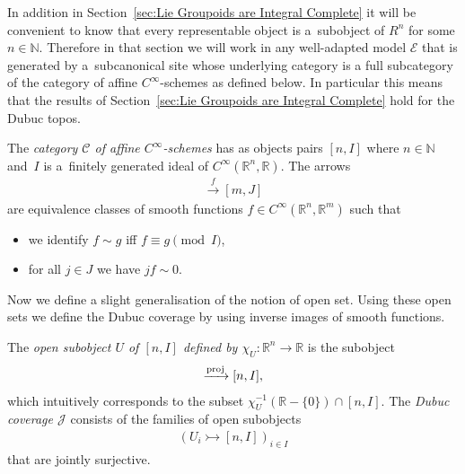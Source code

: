 \documentclass[pdftex]{sigma}
\numberwithin{equation}{section}
\begin{document}
In addition in Section~\ref{sec:Lie Groupoids are Integral Complete} it will be convenient to know that every representable object is a~subobject of $R^n$ for some $n\in \mathbb{N}$. Therefore in that section we will work in any well-adapted model $\mathcal{E}$ that is generated by a~subcanonical site whose underlying category is a full subcategory of the category of af\/f\/ine $C^{\infty}$-schemes as def\/ined below. In particular this means that the results of Section~\ref{sec:Lie Groupoids are Integral Complete} hold for the Dubuc topos.
\begin{Definition}\label{def:smooth-affine-schemes}The \emph{category $\mathcal{C}$ of affine $C^{\infty}$-schemes} has as objects pairs $[n,I]$ where $n\in\mathbb{N}$ and~$I$ is a~f\/initely generated ideal of $C^{\infty}(\mathbb{R}^n,\mathbb{R})$. The arrows
\begin{gather*}[n,I]\xrightarrow{f} [m,J]\end{gather*}
are equivalence classes of smooth functions $f\in C^{\infty}(\mathbb{R}^n,\mathbb{R}^m)$ such that
 \begin{itemize}\itemsep=0pt
 \item we identify $f\sim g$ if\/f $f\equiv g \pmod I$,
 \item for all $j\in J$ we have $jf\sim 0$.
 \end{itemize}
\end{Definition}
Now we def\/ine a slight generalisation of the notion of open set. Using these open sets we def\/ine the Dubuc coverage by using inverse images of smooth functions.
\begin{Definition}The \emph{open subobject $U$ of $[n,I]$ defined by $\chi_U\colon \mathbb{R}^n \rightarrow \mathbb{R}$} is the subobject
 \begin{gather*}[n+1,(I,\chi_U\cdot X_{n+1}-1)] \xrightarrow{{\rm proj}} [n,I],\end{gather*}
which intuitively corresponds to the subset $\chi_U^{-1}(\mathbb{R}-\{0\})\cap[n,I]$. The \emph{Dubuc coverage $\mathcal{J}$} consists of the families of open subobjects
 \begin{gather*}(U_i \rightarrowtail [n,I])_{i\in I}\end{gather*}
that are jointly surjective.
\end{Definition}
\end{document}
